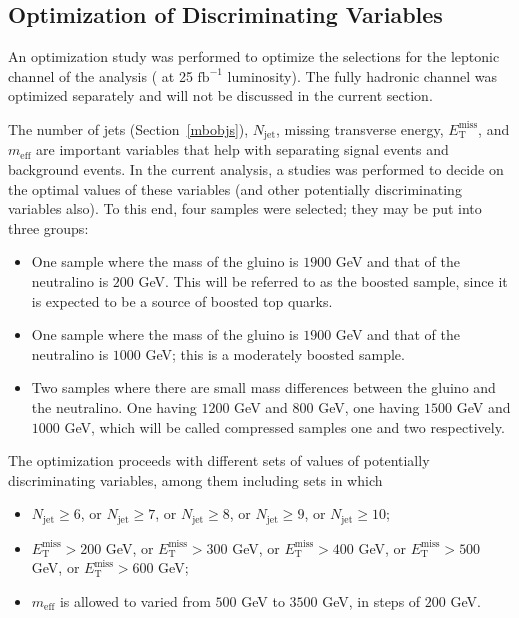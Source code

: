 \subsection{Optimization of Discriminating Variables}\label{mb:opt}

An optimization study was performed to optimize the selections for the
leptonic channel of the analysis ({\color{pink} at 25 $\text{fb}^{-1}$ luminosity}). The
fully hadronic channel was optimized separately and will not be discussed in the
current section.

The number of jets (Section~\ref{mbobjs}), $N_{\text{jet}}$, missing transverse
energy, $E_{\text{T}}^{\text{miss}}$, and $m_{\text{eff}}$ are important
variables that help with separating signal events and background events. In the
current analysis, a studies was performed to decide on the optimal values of
these variables (and other potentially discriminating variables also). To this
end, four samples were selected; they may be put into three groups:

\begin{itemize}

	\item One sample where the mass of the gluino is $1900$ GeV and that of the
	      neutralino is $200$ GeV. This will be referred to as the boosted sample, since
	      it is expected to be a source of boosted top quarks.

	\item One sample where the mass of the gluino is $1900$ GeV and that of the
	      neutralino is $1000$ GeV; this is a moderately boosted sample.

	\item Two samples where there are small mass differences between the gluino and
	      the neutralino. One having $1200$ GeV and $800$ GeV, one having $1500$ GeV and
	      $1000$ GeV, which will be called compressed samples one and two respectively.

\end{itemize}

The optimization proceeds with different sets of values of potentially
discriminating variables, among them including sets in which

\begin{itemize}

	\item $N_{\text{jet}} \geq 6$, or $N_{\text{jet}} \geq 7$, or $N_{\text{jet}}
		      \geq 8$, or $N_{\text{jet}} \geq 9$, or $N_{\text{jet}} \geq 10$;

	\item $E_{\text{T}}^{\text{miss}} > 200$ GeV, or $E_{\text{T}}^{\text{miss}} >
		      300$ GeV, or $E_{\text{T}}^{\text{miss}} > 400$ GeV, or
	      $E_{\text{T}}^{\text{miss}} > 500$ GeV, or $E_{\text{T}}^{\text{miss}} > 600$
	      GeV;

	\item $m_{\text{eff}}$ is allowed to varied from $500$ GeV to $3500$ GeV, in
	      steps of $200$ GeV.

\end{itemize}

